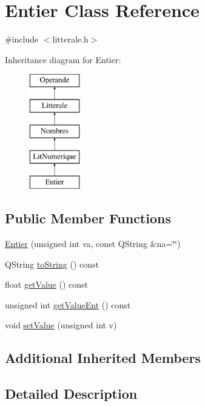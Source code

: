 \hypertarget{class_entier}{}\section{Entier Class Reference}
\label{class_entier}


{\ttfamily \#include $<$litterale.\+h$>$}

Inheritance diagram for Entier\+:\begin{figure}[H]
\begin{center}
\leavevmode
\includegraphics[height=5.000000cm]{class_entier}
\end{center}
\end{figure}
\subsection*{Public Member Functions}
\begin{DoxyCompactItemize}
\item 
\hyperlink{class_entier_a9ea07d2159b38f33cd78c19e432b5ad7}{Entier} (unsigned int va, const Q\+String \&na=\char`\"{}\char`\"{})
\item 
Q\+String \hyperlink{class_entier_aa960356dfeae8af6dfa2cd25136a1a6f}{to\+String} () const 
\item 
float \hyperlink{class_entier_abf00655fade13aac8b37a324e9bbca21}{get\+Value} () const 
\item 
unsigned int \hyperlink{class_entier_a539c8bf0d591a4fea2a007d1976a9e5b}{get\+Value\+Ent} () const 
\item 
void \hyperlink{class_entier_aad8b9c1da48b552657495e467eb50cde}{set\+Value} (unsigned int v)
\end{DoxyCompactItemize}
\subsection*{Additional Inherited Members}


\subsection{Detailed Description}


